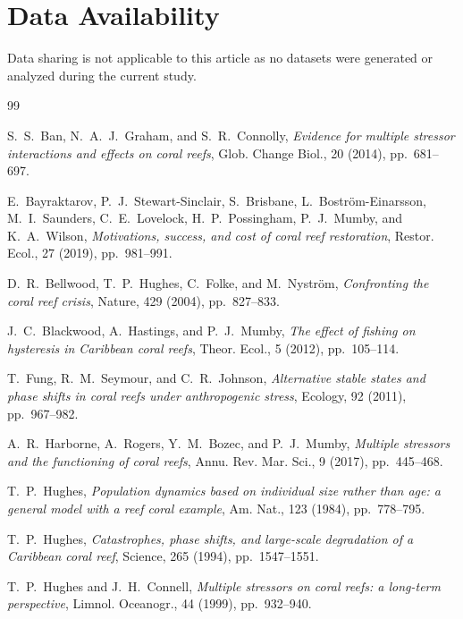 \documentclass[reqno,11pt]{amsart}
\numberwithin{equation}{section}
\begin{document}
\bigskip


\section*{Data Availability}
Data sharing is not applicable to this article as no datasets were generated or analyzed during the current study.

\begin{thebibliography}{99}
	
	{\sc S.~S.~Ban, N.~A.~J.~Graham, and S.~R.~Connolly}, {\em Evidence for multiple stressor interactions and effects on coral reefs}, Glob. Change Biol., 20 (2014), pp.~681--697.
	
	{\sc E.~Bayraktarov, P.~J.~Stewart-Sinclair, S.~Brisbane, L.~Bostr\"om-Einarsson, M.~I.~Saunders, C.~E.~Lovelock, H.~P.~Possingham, P.~J.~Mumby, and K.~A.~Wilson}, {\em Motivations, success, and cost of coral reef restoration}, Restor. Ecol., 27 (2019), pp.~981--991.
	
	{\sc D.~R.~Bellwood, T.~P.~Hughes, C.~Folke, and M.~Nystr\"om}, {\em Confronting the coral reef crisis}, Nature, 429 (2004), pp.~827--833.
	
	{\sc J.~C.~Blackwood, A.~Hastings, and P.~J.~Mumby}, {\em The effect of fishing on hysteresis in Caribbean coral reefs}, Theor. Ecol., 5 (2012), pp.~105--114.
	
	{\sc T.~Fung, R.~M.~Seymour, and C.~R.~Johnson}, {\em Alternative stable states and phase shifts in coral reefs under anthropogenic stress}, Ecology, 92 (2011), pp.~967--982.
	
	{\sc A.~R.~Harborne, A.~Rogers, Y.~M.~Bozec, and P.~J.~Mumby}, {\em Multiple stressors and the functioning of coral reefs}, Annu. Rev. Mar. Sci., 9 (2017), pp.~445--468.
	
	{\sc T.~P.~Hughes}, {\em Population dynamics based on individual size rather than age: a general model with a reef coral example}, Am. Nat., 123 (1984), pp.~778--795.
	
	{\sc T.~P.~Hughes}, {\em Catastrophes, phase shifts, and large-scale degradation of a Caribbean coral reef}, Science, 265 (1994), pp.~1547--1551.
	
	{\sc T.~P.~Hughes and J.~H.~Connell}, {\em Multiple stressors on coral reefs: a long-term perspective}, Limnol. Oceanogr., 44 (1999), pp.~932--940.
	

\end{thebibliography}
\end{document}
